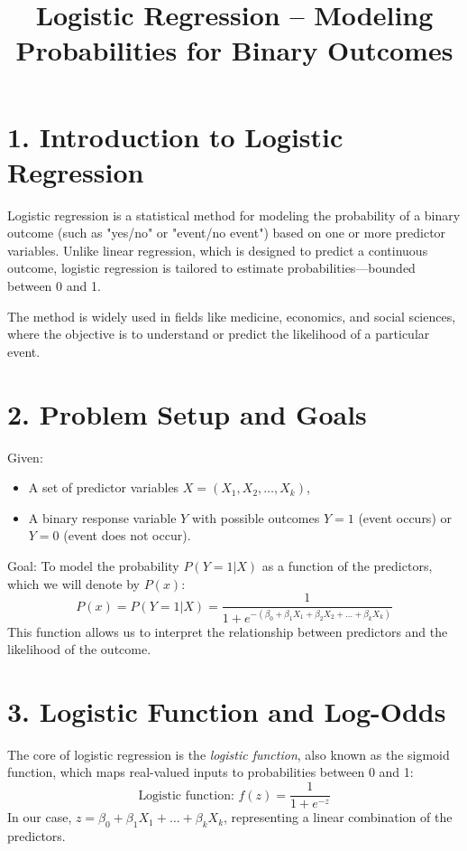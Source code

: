 \documentclass{article}
\title{Logistic Regression – Modeling Probabilities for Binary Outcomes}
\author{}
\date{}
\begin{document}
\maketitle

\section*{1. Introduction to Logistic Regression}

Logistic regression is a statistical method for modeling the probability of a binary outcome (such as "yes/no" or "event/no event") based on one or more predictor variables. Unlike linear regression, which is designed to predict a continuous outcome, logistic regression is tailored to estimate probabilities—bounded between 0 and 1.

The method is widely used in fields like medicine, economics, and social sciences, where the objective is to understand or predict the likelihood of a particular event.

\section*{2. Problem Setup and Goals}

Given:
\begin{itemize}
    \item A set of predictor variables \( X = (X_1, X_2, \dots, X_k) \),
    \item A binary response variable \( Y \) with possible outcomes \( Y = 1 \) (event occurs) or \( Y = 0 \) (event does not occur).
\end{itemize}

Goal:
To model the probability \( P(Y = 1 | X) \) as a function of the predictors, which we will denote by \( P(x) \):
\[
P(x) = P(Y = 1 | X) = \frac{1}{1 + e^{-(\beta_0 + \beta_1 X_1 + \beta_2 X_2 + \dots + \beta_k X_k)}}
\]
This function allows us to interpret the relationship between predictors and the likelihood of the outcome.

\section*{3. Logistic Function and Log-Odds}

The core of logistic regression is the \textit{logistic function}, also known as the sigmoid function, which maps real-valued inputs to probabilities between 0 and 1:
\[
\text{Logistic function: } f(z) = \frac{1}{1 + e^{-z}}
\]
In our case, \( z = \beta_0 + \beta_1 X_1 + \dots + \beta_k X_k \), representing a linear combination of the predictors.
\end{document}
